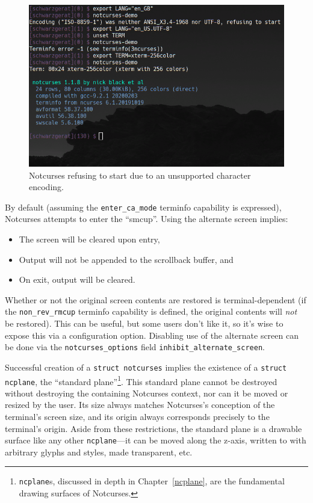 \documentclass[letterpaper,10pt]{article}
\newenvironment{denseitemize}{
  \begin{itemize}
      \setlength{\itemsep}{0pt}
}{
  \end{itemize}
}
\begin{document}
\begin{figure}[!htbp]
\centering \includegraphics[width=.7\linewidth]{media/notcurses-init-fails.png}
\caption{Notcurses refusing to start due to an unsupported character encoding.}
\label{fig:encodingfail}
\end{figure}

By default (assuming the \texttt{enter\_ca\_mode} terminfo capability is expressed),
Notcurses attempts to enter the ``\gls{smcup}''. Using the alternate screen
implies:
\begin{denseitemize}
\item{The screen will be cleared upon entry,}
\item{Output will not be appended to the scrollback buffer, and}
\item{On exit, output will be cleared.}
\end{denseitemize}
Whether or not the original screen contents are restored is terminal-dependent
(if the \texttt{non\_rev\_rmcup} terminfo capability is defined, the original
contents will \textit{not} be restored). This can be useful, but some users
don't like it, so it's wise to expose this via a configuration option.
Disabling use of the alternate screen can be done via the
\texttt{notcurses\_options} field \texttt{inhibit\_alternate\_screen}.

Successful creation of a \texttt{struct notcurses} implies the existence of
a \texttt{struct ncplane}, the ``standard plane''\footnote{\texttt{ncplane}s,
discussed in depth in Chapter~\ref{ncplane}, are the fundamental drawing surfaces of Notcurses.}.
This standard plane cannot be destroyed without destroying the containing
Notcurses context, nor can it be moved or resized by the user. Its size always
matches Notcurses's conception of the terminal's screen size, and its origin
always corresponds precisely to the terminal's origin. Aside from these
restrictions, the standard plane is a drawable surface like any other
\texttt{ncplane}---it can be moved along the z-axis, written to with arbitrary
glyphs and styles, made transparent, etc.
\end{document}
